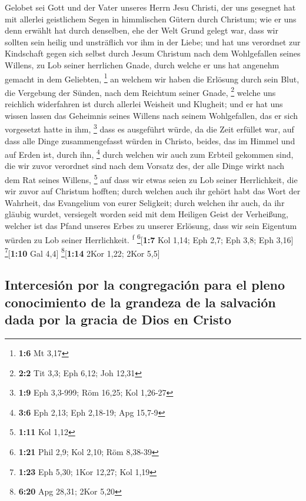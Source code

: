  Gelobet sei Gott und der Vater unseres Herrn Jesu
Christi, der uns gesegnet hat mit allerlei geistlichem Segen in
himmlischen Gütern durch Christum;  wie er uns denn
erwählt hat durch denselben, ehe der Welt Grund gelegt war, dass wir
sollten sein heilig und unsträflich vor ihm in der Liebe; 
und hat uns verordnet zur Kindschaft gegen sich selbst durch Jesum
Christum nach dem Wohlgefallen seines Willens,  zu Lob
seiner herrlichen Gnade, durch welche er uns hat angenehm gemacht in dem
Geliebten, \footnote{\textbf{1:6} Mt 3,17}  an welchem wir
haben die Erlösung durch sein Blut, die Vergebung der Sünden, nach dem
Reichtum seiner Gnade, \footnote{\textbf{2:2} Tit 3,3; Eph 6,12; Joh
  12,31}  welche uns reichlich widerfahren ist durch
allerlei Weisheit und Klugheit;  und er hat uns wissen
lassen das Geheimnis seines Willens nach seinem Wohlgefallen, das er
sich vorgesetzt hatte in ihm, \footnote{\textbf{1:9} Eph 3,3-999; Röm
  16,25; Kol 1,26-27}  dass es ausgeführt würde, da die
Zeit erfüllet war, auf dass alle Dinge zusammengefasst würden in
Christo, beides, das im Himmel und auf Erden ist, durch ihn, \footnote{\textbf{3:6}
  Eph 2,13; Eph 2,18-19; Apg 15,7-9}  durch welchen wir
auch zum Erbteil gekommen sind, die wir zuvor verordnet sind nach dem
Vorsatz des, der alle Dinge wirkt nach dem Rat seines Willens,
\footnote{\textbf{1:11} Kol 1,12}  auf dass wir etwas
seien zu Lob seiner Herrlichkeit, die wir zuvor auf Christum hofften;
 durch welchen auch ihr gehört habt das Wort der
Wahrheit, das Evangelium von eurer Seligkeit; durch welchen ihr auch, da
ihr gläubig wurdet, versiegelt worden seid mit dem Heiligen Geist der
Verheißung,  welcher ist das Pfand unseres Erbes zu
unserer Erlösung, dass wir sein Eigentum würden zu Lob seiner
Herrlichkeit. \textsuperscript{f} \footnote{\textbf{1:21} Phil 2,9; Kol
  2,10; Röm 8,38-39}{[}\textbf{1:7} Kol 1,14; Eph 2,7; Eph 3,8; Eph
3,16{]} \footnote{\textbf{1:23} Eph 5,30; 1Kor 12,27; Kol 1,19}{[}\textbf{1:10}
Gal 4,4{]} \footnote{\textbf{6:20} Apg 28,31; 2Kor 5,20}{[}\textbf{1:14}
2Kor 1,22; 2Kor 5,5{]}

\hypertarget{intercesiuxf3n-por-la-congregaciuxf3n-para-el-pleno-conocimiento-de-la-grandeza-de-la-salvaciuxf3n-dada-por-la-gracia-de-dios-en-cristo}{%
\subsection{Intercesión por la congregación para el pleno conocimiento
de la grandeza de la salvación dada por la gracia de Dios en
Cristo}\label{intercesiuxf3n-por-la-congregaciuxf3n-para-el-pleno-conocimiento-de-la-grandeza-de-la-salvaciuxf3n-dada-por-la-gracia-de-dios-en-cristo}}

